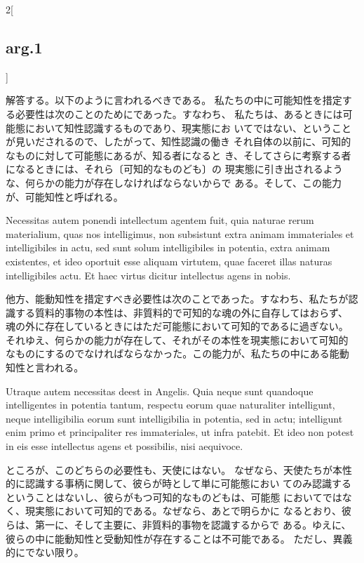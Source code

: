 \documentclass[paper=a4paper,fontsize=10pt,jafontsize=9pt,titlepage]{jlreq}
\begin{document}
\begin{paracol}{2}[\subsection{arg.1}]
\switchcolumn

解答する。以下のように言われるべきである。
私たちの中に可能知性を措定する必要性は次のことのためにであった。すなわち、
 私たちは、あるときには可能態において知性認識するものであり、現実態にお
 いてではない、ということが見いだされるので、したがって、知性認識の働き
 それ自体の以前に、可知的なものに対して可能態にあるが、知る者になると
 き、そしてさらに考察する者になるときには、それら〔可知的なものども〕の
 現実態に引き出されるような、何らかの能力が存在しなければならないからで
 ある。そして、この能力が、可能知性と呼ばれる。

\switchcolumn*

Necessitas
autem ponendi intellectum agentem fuit, quia naturae rerum materialium,
quas nos intelligimus, non subsistunt extra animam immateriales et
intelligibiles in actu, sed sunt solum intelligibiles in potentia, extra
animam existentes, et ideo oportuit esse aliquam virtutem, quae faceret
illas naturas intelligibiles actu. Et haec virtus dicitur intellectus
agens in nobis.

\switchcolumn

他方、能動知性を措定すべき必要性は次のことであった。すなわち、私たちが認
 識する質料的事物の本性は、非質料的で可知的な魂の外に自存してはおらず、
 魂の外に存在しているときにはただ可能態において可知的であるに過ぎない。
 それゆえ、何らかの能力が存在して、それがその本性を現実態において可知的
 なものにするのでなければならなかった。この能力が、私たちの中にある能動
 知性と言われる。

\switchcolumn*

Utraque autem necessitas deest in Angelis. Quia neque
sunt quandoque intelligentes in potentia tantum, respectu eorum quae
naturaliter intelligunt, neque intelligibilia eorum sunt intelligibilia
in potentia, sed in actu; intelligunt enim primo et principaliter res
immateriales, ut infra patebit. Et ideo non potest in eis esse
intellectus agens et possibilis, nisi aequivoce.

\switchcolumn

ところが、このどちらの必要性も、天使にはない。
なぜなら、天使たちが本性的に認識する事柄に関して、彼らが時として単に可能態におい
 てのみ認識するということはないし、彼らがもつ可知的なものどもは、可能態
 においてではなく、現実態において可知的である。なぜなら、あとで明らかに
 なるとおり、彼らは、第一に、そして主要に、非質料的事物を認識するからで
 ある。ゆえに、彼らの中に能動知性と受動知性が存在することは不可能である。
 ただし、異義的にでない限り。

\switchcolumn*[\subsection{ad.1}]


\end{paracol}
\end{document}

